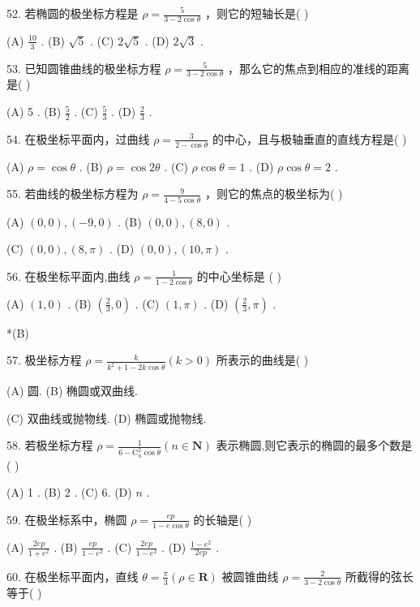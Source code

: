 \documentclass[10pt]{article}
\begin{document}
52. 若椭圆的极坐标方程是 \(\rho  = \frac{5}{3 - 2\cos \theta }\) ，则它的短轴长是( )

(A) \(\frac{10}{3}\) . (B) \(\sqrt{5}\) . (C) \(2\sqrt{5}\) . (D) \(2\sqrt{3}\) .

53. 已知圆锥曲线的极坐标方程 \(\rho  = \frac{5}{3 - 2\cos \theta }\) ，那么它的焦点到相应的准线的距离是( )

(A) 5 . (B) \(\frac{5}{2}\) . (C) \(\frac{5}{3}\) . (D) \(\frac{2}{3}\) .

54. 在极坐标平面内，过曲线 \(\rho  = \frac{3}{2 - \cos \theta }\) 的中心，且与极轴垂直的直线方程是( )

(A) \(\rho  = \cos \theta\) . (B) \(\rho  = \cos {2\theta }\) . (C) \(\rho \cos \theta  = 1\) . (D) \(\rho \cos \theta  = 2\) .

55. 若曲线的极坐标方程为 \(\rho  = \frac{9}{4 - 5\cos \theta }\) ，则它的焦点的极坐标为( )

(A) \(\left( {0,0}\right) ,\left( {-9,0}\right)\) . (B) \(\left( {0,0}\right) ,\left( {8,0}\right)\) .

(C) \(\left( {0,0}\right) ,\left( {8,\pi }\right)\) . (D) \(\left( {0,0}\right) ,\left( {{10},\pi }\right)\) .

56. 在极坐标平面内,曲线 \(\rho  = \frac{1}{1 - 2\cos \theta }\) 的中心坐标是 ( )

(A) \(\left( {1,0}\right)\) . (B) \(\left( {\frac{2}{3},0}\right)\) . (C) \(\left( {1,\pi }\right)\) . (D) \(\left( {\frac{2}{3},\pi }\right)\) .

*(B)

57. 极坐标方程 \(\rho  = \frac{k}{{k}^{2} + 1 - {2k}\cos \theta }\left( {k > 0}\right)\) 所表示的曲线是( )

(A) 圆. (B) 椭圆或双曲线.

(C) 双曲线或抛物线. (D) 椭圆或抛物线.

58. 若极坐标方程 \(\rho  = \frac{1}{6 - {\mathrm{C}}_{n}^{2}\cos \theta }\left( {n \in  \mathbf{N}}\right)\) 表示椭圆,则它表示的椭圆的最多个数是( )

(A) 1 . (B) 2 . (C) 6. (D) \(n\) .

59. 在极坐标系中，椭圆 \(\rho  = \frac{ep}{1 - e\cos \theta }\) 的长轴是( )

(A) \(\frac{2ep}{1 + {e}^{2}}\) . (B) \(\frac{ep}{1 - {e}^{2}}\) . (C) \(\frac{2ep}{1 - {e}^{2}}\) . (D) \(\frac{1 - {e}^{2}}{2ep}\) .

60. 在极坐标平面内，直线 \(\theta  = \frac{\pi }{3}\left( {\rho  \in  \mathbf{R}}\right)\) 被圆锥曲线 \(\rho  = \frac{2}{3 - 2\cos \theta }\) 所截得的弦长等于( )
\end{document}
